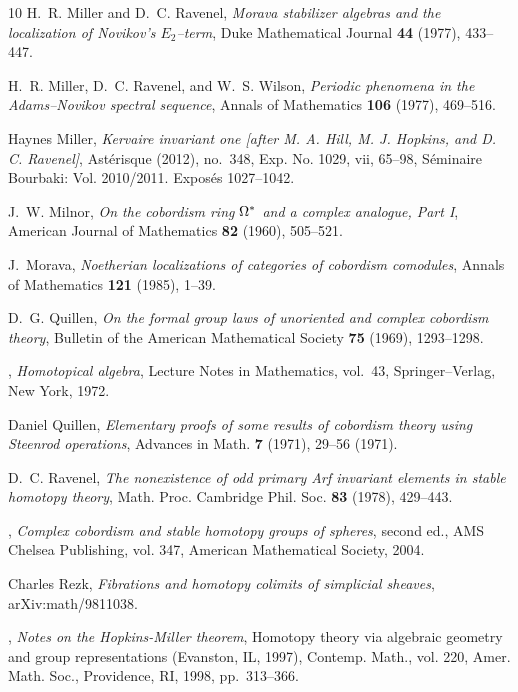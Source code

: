 \documentclass{amsart}
\theoremstyle{definition}
\theoremstyle{remark}
\begin{document}
\begin{thebibliography}{10}
H.~R. Miller and D.~C. Ravenel, \emph{Morava stabilizer algebras and the
  localization of {Novikov's $E_2$--term}}, Duke Mathematical Journal
  \textbf{44} (1977), 433--447.

H.~R. Miller, D.~C. Ravenel, and W.~S. Wilson, \emph{Periodic phenomena in the
  {Adams--Novikov} spectral sequence}, Annals of Mathematics \textbf{106}
  (1977), 469--516.

Haynes Miller, \emph{Kervaire invariant one [after {M}. {A}. {H}ill, {M}. {J}.
  {H}opkins, and {D}. {C}. {R}avenel]}, Ast\'erisque (2012), no.~348, Exp. No.
  1029, vii, 65--98, S{\'e}minaire Bourbaki: Vol. 2010/2011. Expos{\'e}s
  1027--1042. 

J.~W. Milnor, \emph{On the cobordism ring {$\Omega\sp{*}$} and a complex
  analogue, {Part I}}, American Journal of Mathematics \textbf{82} (1960),
  505--521.

J.~Morava, \emph{Noetherian localizations of categories of cobordism
  comodules}, Annals of Mathematics \textbf{121} (1985), 1--39.

D.~G. Quillen, \emph{On the formal group laws of unoriented and complex
  cobordism theory}, Bulletin of the American Mathematical Society \textbf{75}
  (1969), 1293--1298.

\bysame, \emph{Homotopical algebra}, Lecture Notes in Mathematics, vol.~43,
  Springer--Verlag, New York, 1972.

Daniel Quillen, \emph{Elementary proofs of some results of cobordism theory
  using {S}teenrod operations}, Advances in Math. \textbf{7} (1971), 29--56
  (1971). 

D.~C. Ravenel, \emph{The nonexistence of odd primary {Arf} invariant elements
  in stable homotopy theory}, Math. Proc. Cambridge Phil. Soc. \textbf{83}
  (1978), 429--443.

\bysame, \emph{Complex cobordism and stable homotopy groups of spheres}, second
  ed., AMS Chelsea Publishing, vol. 347, American Mathematical Society, 2004.

Charles Rezk, \emph{Fibrations and homotopy colimits of simplicial sheaves},
  arXiv:math/9811038.

\bysame, \emph{Notes on the {H}opkins-{M}iller theorem}, Homotopy theory via
  algebraic geometry and group representations ({E}vanston, {IL}, 1997),
  Contemp. Math., vol. 220, Amer. Math. Soc., Providence, RI, 1998,
  pp.~313--366. 


\end{thebibliography}
\end{document}
